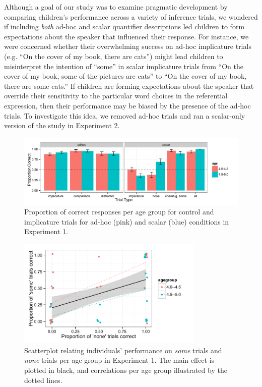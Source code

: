 \documentclass[10pt,letterpaper]{article}
\begin{document}
Although a goal of our study was to examine pragmatic development by comparing children's performance across a variety of inference trials, we wondered if including \emph{both} ad-hoc and scalar quantifier descriptions led children to form expectations about the speaker that influenced their response. For instance, we were concerned whether their overwhelming success on ad-hoc implicature trials (e.g. ``On the cover of my book, there are cats'') might lead children to misinterpret the intention of ``some'' in scalar implicature trials from ``On the cover of my book, some of the pictures are cats'' to ``On the cover of my book, there are some cats.'' If children are forming expectations about the speaker that override their sensitivity to the particular word choices in the referential expression, then their performance may be biased by the presence of the ad-hoc trials.  To investigate this idea, we removed ad-hoc trials and ran a scalar-only version of the study in Experiment 2. 

\begin{figure}[t] 
  \begin{center} 
    \includegraphics[width=7.5in]{figures/implicatures_adhocScalar_long.pdf} 
    \caption{\label{fig:expt1} Proportion of correct responses per age group for control and implicature trials for ad-hoc (pink) and scalar (blue) conditions in Experiment 1.    }
    \end{center} 
\vspace{-1ex} 
\end{figure}

\begin{figure}[h] 
  \begin{center} 
    \includegraphics[width=3.5in]{figures/implicatures_adhocScalar_scatterplot.pdf} 
    \caption{\label{fig:expt1scatterplot} Scatterplot relating individuals' performance on \emph{some} trials and \emph{none} trials per age group in Experiment 1. The main effect is plotted in black, and correlations per age group illustrated by the dotted lines.    }
    \end{center} 
\vspace{-1ex} 
\end{figure}
\end{document}
